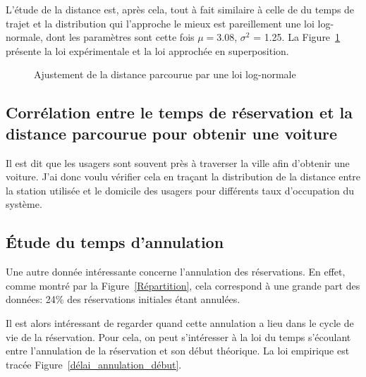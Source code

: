 \documentclass[12pt,a4paper]{article}
\newcommand{\1}[1]{\mathbbm{1}_{\{#1\}} }
\theoremstyle{definition}
\begin{document}
{L'étude de la distance est, après cela, tout à fait similaire à celle de du temps de trajet et la distribution qui l'approche le mieux est pareillement une loi log-normale, dont les paramètres sont cette fois $\mu = 3.08 $, $\sigma^2$ = 1.25. La Figure~\ref{Ajustement_distance} présente la loi expérimentale et la loi approchée en superposition.

\begin{figure}[!h]
\centering
{}
\caption{Ajustement de la distance parcourue par une loi log-normale}
\label{Ajustement_distance}
\end{figure}

\subsection{Corrélation entre le temps de réservation et la distance parcourue pour obtenir une voiture}

Il est dit que les usagers sont souvent près à traverser la ville afin d'obtenir une voiture. J'ai donc voulu vérifier cela en traçant la distribution de la distance entre la station utilisée et le domicile des usagers pour différents taux d'occupation du système.
\subsection{Étude du temps d'annulation}



Une autre donnée intéressante concerne l'annulation des réservations. En effet, comme montré par la Figure~\ref{Répartition}, cela correspond à une grande part des données: 24\% des réservations initiales étant annulées. 

Il est alors intéressant de regarder quand cette annulation a lieu dans le cycle de vie de la réservation. Pour cela, on peut s'intéresser à la loi du temps s'écoulant entre l'annulation de la réservation et son début théorique. La loi empirique est tracée Figure~\ref{délai_annulation_début}.

}
\end{document}
